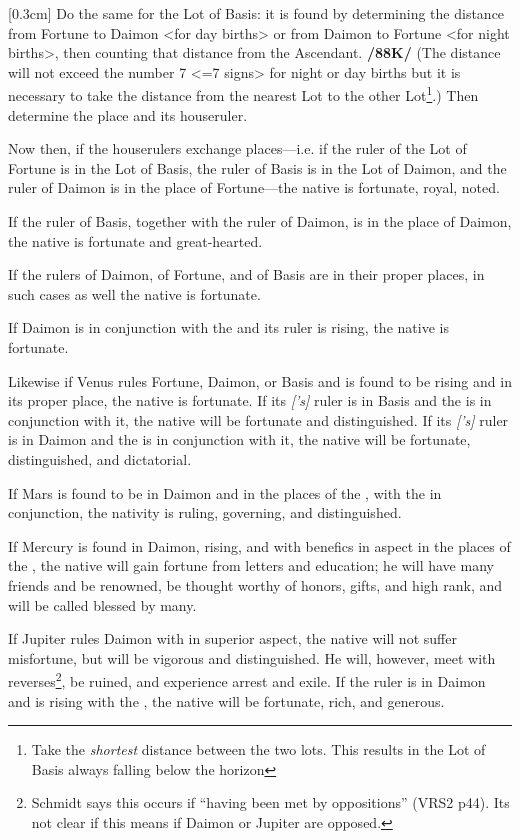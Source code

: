 [0.3cm]
Do the same for the Lot of Basis: it is found by determining the distance from Fortune to Daimon <for day births> or from Daimon to Fortune <for night births>, then counting that distance from the Ascendant. \textbf{/88K/} (The distance will not exceed the number 7 <=7 signs> for night or day births but it is necessary to take the distance from the nearest Lot to the other Lot\footnote{Take the \textsl{shortest} distance between the two lots. This results in the Lot of Basis always falling below the horizon}.) Then determine the place and its houseruler.

Now then, if the houserulers exchange places—i.e. if the ruler of the Lot of Fortune is in the Lot of Basis, the ruler of Basis is in the Lot of Daimon, and the ruler of Daimon is in the place of Fortune—the native is fortunate, royal, noted. 

If the ruler of Basis, together with the ruler of Daimon, is in the place of Daimon, the native is fortunate and great-hearted. 

If the rulers of Daimon, of Fortune, and of Basis are in
their proper places, in such cases as well the native is fortunate. 

If Daimon  is in conjunction with the \Sun\xspace and its ruler is rising, the native is fortunate. 

Likewise if Venus rules Fortune, Daimon, or Basis and is found to be rising and in its proper place, the native is fortunate. If its \textsl{[\Venus's]} ruler is in Basis and the \Moon\xspace is in conjunction with it, the native will be fortunate and distinguished. If its \textsl{[\Venus's]} ruler is in Daimon and the \Sun\xspace is in conjunction with it, the native will be fortunate, distinguished, and dictatorial.

If Mars is found to be in Daimon and in the places of the \Moon, with the \Moon\xspace in conjunction, the nativity is ruling, governing, and distinguished. 

If Mercury is found in Daimon, rising, and with benefics in aspect in the places of the \Moon, the native will gain fortune from letters and education; he will have
many friends and be renowned, be thought worthy of honors, gifts, and high rank, and will be called blessed by many. 

If Jupiter rules Daimon with \Mars\xspace in superior aspect, the native will not suffer misfortune, but will be vigorous and distinguished. He will, however, meet with reverses\footnote{Schmidt says this occurs if ``having been met by oppositions'' (VRS2 p44). Its not clear if this means if Daimon or Jupiter are opposed.}, be ruined, and experience arrest and exile. If the ruler is in Daimon and is rising with the \Moon, the native will be fortunate, rich, and generous. 

